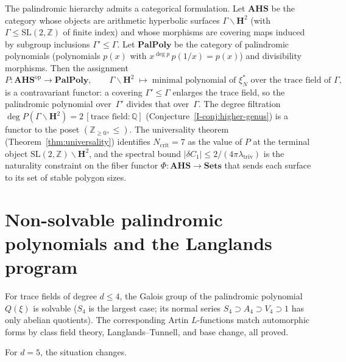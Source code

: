 \begin{remark}
\label{rem:stability-category}
The palindromic hierarchy admits a categorical formulation.
Let $\mathbf{AHS}$ be the category whose objects are arithmetic
hyperbolic surfaces $\Gamma\backslash\mathbf{H}^2$ (with
$\Gamma \le \mathrm{SL}(2,\mathbb{Z})$ of finite index) and whose
morphisms are covering maps induced by subgroup inclusions
$\Gamma' \le \Gamma$.
Let $\mathbf{PalPoly}$ be the category of palindromic polynomials
(polynomials $p(x)$ with $x^{\deg p}\, p(1/x) = p(x)$) and
divisibility morphisms.
Then the assignment
\[
  P \colon \mathbf{AHS}^{\mathrm{op}} \to \mathbf{PalPoly},
  \qquad
  \Gamma\backslash\mathbf{H}^2 \;\longmapsto\;
  \text{minimal polynomial of } \xi^*_N
  \text{ over the trace field of } \Gamma,
\]
is a contravariant functor: a covering $\Gamma' \le \Gamma$
enlarges the trace field, so the palindromic polynomial
over~$\Gamma'$ divides that over~$\Gamma$.
The degree filtration
$\deg P(\Gamma\backslash\mathbf{H}^2) = 2\,[\text{trace field}:\mathbb{Q}]$
(Conjecture~\ref{I-conj:higher-genus}) is a functor to the
poset $(\mathbb{Z}_{\ge 0}, \le)$.
The universality theorem (Theorem~\ref{thm:universality})
identifies $N_{\mathrm{crit}} = 7$ as the value of $P$ at the
terminal object $\mathrm{SL}(2,\mathbb{Z})\backslash\mathbf{H}^2$,
and the spectral bound
$|\delta C_1| \le 2/(4\pi\lambda_{\mathrm{triv}})$
is the naturality constraint on the fiber functor
$\Phi \colon \mathbf{AHS} \to \mathbf{Sets}$
that sends each surface to its set of stable polygon sizes.
\end{remark}

\section{Non-solvable palindromic polynomials and the Langlands program}
\label{sec:nonsolvable}

For trace fields of degree $d \le 4$, the Galois group of the
palindromic polynomial $Q(\xi)$ is solvable ($S_4$ is the largest
case; its normal series $S_4 \supset A_4 \supset V_4 \supset 1$
has only abelian quotients).  The corresponding Artin $L$-functions
match automorphic forms by class field theory, Langlands--Tunnell,
and base change, all proved.

For $d = 5$, the situation changes.

